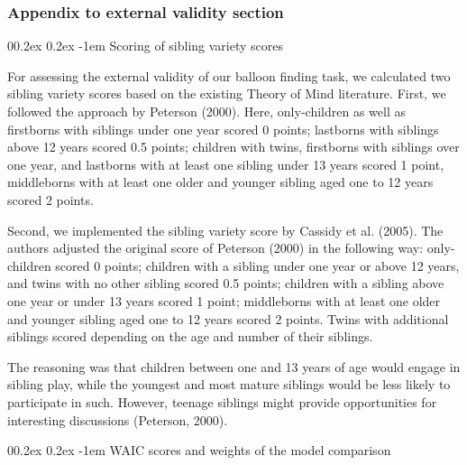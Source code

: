 \documentclass[
  man,floatsintext]{apa6}
\makeatletter
\let\oldparagraph\paragraph
\renewcommand{\paragraph}[1]{\oldparagraph{#1}\mbox{}}
\renewcommand{\paragraph}{\@startsection{paragraph}{4}{\parindent}%
  {0\baselineskip \@plus 0.2ex \@minus 0.2ex}%
  {-1em}%
  {\normalfont\normalsize\bfseries\itshape\typesectitle}}
\makeatother
\begin{document}
\hypertarget{appendix-to-external-validity-section}{%
\subsubsection{Appendix to external validity section}\label{appendix-to-external-validity-section}}

\hypertarget{scoring-of-sibling-variety-scores}{%
\paragraph{Scoring of sibling variety scores}\label{scoring-of-sibling-variety-scores}}

For assessing the external validity of our balloon finding task, we calculated two sibling variety scores based on the existing Theory of Mind literature.
First, we followed the approach by Peterson (2000). Here, only-children as well as firstborns with siblings under one year scored 0 points; lastborns with siblings above 12 years scored 0.5 points; children with twins, firstborns with siblings over one year, and lastborns with at least one sibling under 13 years scored 1 point, middleborns with at least one older and younger sibling aged one to 12 years scored 2 points.

Second, we implemented the sibling variety score by Cassidy et al. (2005). The authors adjusted the original score of Peterson (2000) in the following way: only-children scored 0 points; children with a sibling under one year or above 12 years, and twins with no other sibling scored 0.5 points; children with a sibling above one year or under 13 years scored 1 point; middleborns with at least one older and younger sibling aged one to 12 years scored 2 points. Twins with additional siblings scored depending on the age and number of their siblings.

The reasoning was that children between one and 13 years of age would engage in sibling play, while the youngest and most mature siblings would be less likely to participate in such. However, teenage siblings might provide opportunities for interesting discussions (Peterson, 2000).

\hypertarget{waic-scores-and-weights-of-the-model-comparison}{%
\paragraph{WAIC scores and weights of the model comparison}\label{waic-scores-and-weights-of-the-model-comparison}}
\end{document}
